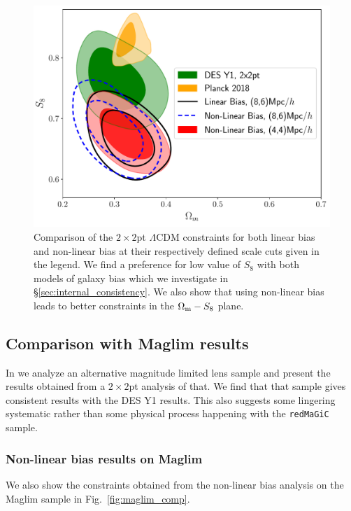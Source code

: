 \documentclass[fleqn,usenatbib]{mnras}
\newcommand{\redmagic}{\texttt{redMaGiC} }
\newcommand{\blue}[1]{\textcolor{blue}{#1}}
\begin{document}
\begin{figure}
\includegraphics[width=\columnwidth]{figs/data_lcdm_comp.pdf}
\caption[]{Comparison of the $2\times2$pt $\Lambda$CDM constraints for both linear bias and non-linear bias at their respectively defined scale cuts given in the legend. We find a preference for low value of $S_8$ with both models of galaxy bias which we investigate in \S\ref{sec:internal_consistency}. We also show that using non-linear bias leads to better constraints in the $\Omega_{\rm m} - S_8$ plane. }\label{fig:des_comp}
\end{figure}

\subsection{Comparison with Maglim results}
In \citet{y3-2x2ptaltlensresults} we analyze an alternative magnitude limited lens sample and present the results obtained from a $2\times2$pt analysis of that. We find that that sample gives consistent results with the DES Y1 results. This also suggests some lingering systematic rather than some physical process happening with the \redmagic sample.  
\subsubsection{Non-linear bias results on Maglim}
We also show the constraints obtained from the non-linear bias analysis on the Maglim sample in Fig.~\ref{fig:maglim_comp}. 
\end{document}
